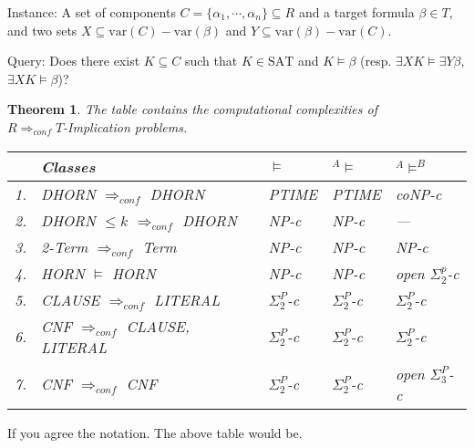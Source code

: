 \documentclass[12pt]{article}
\newcommand{\AMB}{\mbox{$^A$\hspace{-0.5mm}$\models^B$}}
\newcommand{\AM}{\mbox{$^A$\hspace{-0.5mm}$\models$}}
\newtheorem{theorem}{Theorem}[section]
\begin{document}
\begin{description}
\item {Instance:} A set of components $C=\{\alpha_1,\cdots, \alpha_n\}\subseteq R$ and a target formula $\beta\in T$, and two sets $X\subseteq \mbox{var}(C)-\mbox{var}(\beta)$ and $Y\subseteq \mbox{var}(\beta)-\mbox{var}(C)$.
\item {Query:} Does there exist $K\subseteq C$ such that $K\in \mbox{SAT}$ and $K\models \beta$ (resp. $\exists X K\models \exists Y \beta$, $\exists X K
\models \beta$)?
\end{description}
\color{black}


\begin{theorem}
The table contains the computational complexities of\\ $R \Longrightarrow_{conf} T$-Implication problems.\\
\begin{tabular}{|l|l|l|l|l|}
\hline
 & {\em Classes} &  $\models$ & \AM & \AMB \\ \hline
1. & DHORN $\Rightarrow_{conf}$ DHORN          & PTIME & PTIME  & coNP-c         \\ \hline
2. & DHORN $\leq k$ $\Rightarrow_{conf}$ DHORN & NP-c  & NP-c   & ---         \\ \hline
3. & 2-Term $\Rightarrow_{conf}$ Term          & NP-c  & NP-c   & NP-c           \\ \hline
4. & HORN $\models$ HORN                       & NP-c  & NP-c   & open $\Sigma^p_2$-c \\ \hline
5. & CLAUSE $\Rightarrow_{conf}$ LITERAL       & $\Sigma_2^P$-c & $\Sigma_2^P$-c & $\Sigma_2^P$-c \\ \hline
6. & CNF $\Rightarrow_{conf}$ CLAUSE, LITERAL  & $\Sigma_2^P$-c & $\Sigma_2^P$-c & $\Sigma_2^P$-c \\ \hline
7. & CNF $\Rightarrow_{conf}$ CNF              & $\Sigma_2^P$-c & $\Sigma_2^P$-c & open $\Sigma_3^P$-c \\ \hline
\end{tabular}
\end{theorem}

\color{red}
\noindent If you agree the notation. The above table would be.\\
\end{document}
